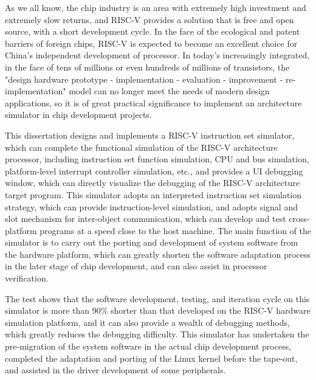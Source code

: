 \begin{abstract*}
  As we all know, the chip industry is an area with extremely high investment and extremely slow returns, and RISC-V provides a solution that is free and open source, with a short development cycle. In the face of the ecological and patent barriers of foreign chips, RISC-V is expected to become an excellent choice for China's independent development of processor. In today's increasingly integrated, in the face of tens of millions or even hundreds of millions of transistors, the "design hardware prototype - implementation - evaluation - improvement - re-implementation" model can no longer meet the needs of modern design applications, so it is of great practical significance to implement an architecture simulator in chip development projects.


  This dissertation designs and implements a RISC-V instruction set simulator, which can complete the functional simulation of the RISC-V architecture processor, including instruction set function simulation, CPU and bus simulation, platform-level interrupt controller simulation, etc., and provides a UI debugging window, which can directly visualize the debugging of the RISC-V architecture target program. This simulator adopts an interpreted instruction set simulation strategy, which can provide instruction-level simulation, and adopts signal and slot mechanism for inter-object communication, which can develop and test cross-platform programs at a speed close to the host machine. The main function of the simulator is to carry out the porting and development of system software from the hardware platform, which can greatly shorten the software adaptation process in the later stage of chip development, and can also assist in processor verification.

  
  The test shows that the software development, testing, and iteration cycle on this simulator is more than 90\% shorter than that developed on the RISC-V hardware simulation platform, and it can also provide a wealth of debugging methods, which greatly reduces the debugging difficulty. This simulator has undertaken the pre-migration of the system software in the actual chip development process, completed the adaptation and porting of the Linux kernel before the tape-out, and assisted in the driver development of some peripherals.
\end{abstract*}
